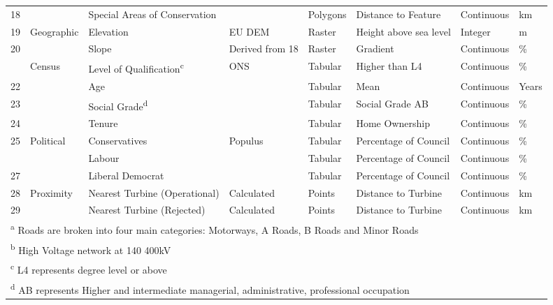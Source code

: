 \documentclass[a4paper,]{article}
\theoremstyle{definition}
\theoremstyle{definition}
\theoremstyle{definition}
\theoremstyle{remark}
\begin{document}
\begin{landscape}
\begin{table}
{\begin{tabular}[t]{rlllllll}
18 &  & Special Areas of Conservation &  & Polygons & Distance to Feature & Continuous & km\\
19 & Geographic & Elevation & EU DEM & Raster & Height above sea level & Integer & m\\
20 &  & Slope & Derived from 18 & Raster & Gradient & Continuous & \%\\
\addlinespace
21 & Census & Level of Qualification\textsuperscript{c} & ONS & Tabular & Higher than L4 & Continuous & \%\\
22 &  & Age &  & Tabular & Mean & Continuous & Years\\
23 &  & Social Grade\textsuperscript{d} &  & Tabular & Social Grade AB & Continuous & \%\\
24 &  & Tenure &  & Tabular & Home Ownership & Continuous & \%\\
25 & Political & Conservatives & Populus & Tabular & Percentage of Council & Continuous & \%\\
\addlinespace
26 &  & Labour &  & Tabular & Percentage of Council & Continuous & \%\\
27 &  & Liberal Democrat &  & Tabular & Percentage of Council & Continuous & \%\\
28 & Proximity & Nearest Turbine (Operational) & Calculated & Points & Distance to Turbine & Continuous & km\\
29 &  & Nearest Turbine (Rejected) & Calculated & Points & Distance to Turbine & Continuous & km\\
\bottomrule
\multicolumn{8}{l}{\textsuperscript{a} Roads are broken into four main categories: Motorways, A Roads, B Roads and Minor Roads}\\
\multicolumn{8}{l}{\textsuperscript{b} High Voltage network at 140 400kV}\\
\multicolumn{8}{l}{\textsuperscript{c} L4 represents degree level or above}\\
\multicolumn{8}{l}{\textsuperscript{d} AB represents Higher and intermediate managerial, administrative, professional occupation}\\
\end{tabular}}
\end{table}
\end{landscape}
\end{document}
